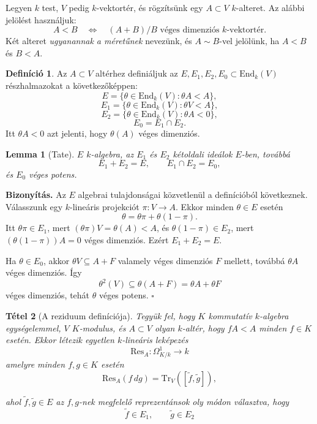 \documentclass[a4paper,12pt]{article}
\theoremstyle{definition}
\newtheorem{definition}{Definíció}[section]
\newenvironment{biz}{\par\noindent\textbf{Bizonyítás.}\enspace\ignorespaces}
{\hfill$\square$\par}
\theoremstyle{plain}
\newtheorem{theorem}{Tétel}[section]
\newtheorem{lemma}[theorem]{Lemma}
\theoremstyle{remark}
\newcommand{\End}{\mathrm{End}}
\newcommand{\Res}{\mathrm{Res}}
\newcommand{\Tr}{\mathrm{Tr}}
\begin{document}
Legyen $k$ test, $V$ pedig $k$-vektortér, és rögzítsünk egy $A\subset V$ $k$-alteret. Az alábbi jelölést használjuk:
\[
A<B \quad\Longleftrightarrow\quad (A+B)/B \text{ véges dimenziós } k\text{-vektortér}.
\]
Két alteret \emph{ugyanannak a méretűnek} nevezünk, és $A\sim B$-vel jelölünk, ha $A<B$ és $B<A$.

\begin{definition}
Az $A\subset V$ altérhez definiáljuk az $E,E_1,E_2,E_0\subset \End_k(V)$ részhalmazokat a következőképpen:
\[
E=\{\theta\in\End_k(V):\theta A<A\},
\]
\[
E_1=\{\theta\in\End_k(V):\theta V<A\},
\]
\[
E_2=\{\theta\in\End_k(V):\theta A<0\},
\]
\[
E_0=E_1\cap E_2.
\]
Itt $\theta A<0$ azt jelenti, hogy $\theta(A)$ véges dimenziós.
\end{definition}

\begin{lemma}[Tate]
$E$ $k$-algebra, az $E_1$ és $E_2$ kétoldali ideálok $E$-ben, továbbá
\[
E_1+E_2=E,\qquad E_1\cap E_2=E_0,
\]
és $E_0$ véges potens.
\end{lemma}

\begin{biz}
Az $E$ algebrai tulajdonságai közvetlenül a definícióból következnek. Válasszunk egy $k$-lineáris projekciót $\pi:V\to A$. Ekkor minden $\theta\in E$ esetén
\[
\theta=\theta\pi+\theta(1-\pi).
\]
Itt $\theta\pi\in E_1$, mert $(\theta\pi)V=\theta(A)<A$, és $\theta(1-\pi)\in E_2$, mert $(\theta(1-\pi))A=0$ véges dimenziós. Ezért $E_1+E_2=E$.

Ha $\theta\in E_0$, akkor $\theta V\subseteq A+F$ valamely véges dimenziós $F$ mellett, továbbá $\theta A$ véges dimenziós. Így
\[
\theta^2(V)\subseteq \theta(A+F)=\theta A+\theta F
\]
véges dimenziós, tehát $\theta$ véges potens.
\end{biz}

\begin{theorem}[A reziduum definíciója]
\label{thm:abstract_residue}
Tegyük fel, hogy $K$ kommutatív $k$-algebra egységelemmel, $V$ $K$-modulus, és $A\subset V$ olyan $k$-altér, hogy $fA<A$ minden $f\in K$ esetén. Ekkor létezik egyetlen $k$-lineáris leképezés
\[
\Res_A:\Omega^1_{K/k}\longrightarrow k
\]
amelyre minden $f,g\in K$ esetén
\[
\Res_A(f\,dg)=\Tr_V([\tilde f,\tilde g]),
\]

ahol $\tilde f,\tilde g\in E$ az $f,g$-nek megfelelő reprezentánsok oly módon választva, hogy
\[
\tilde f\in E_1,\qquad \tilde g\in E_2
\]

\end{theorem}
\end{document}
